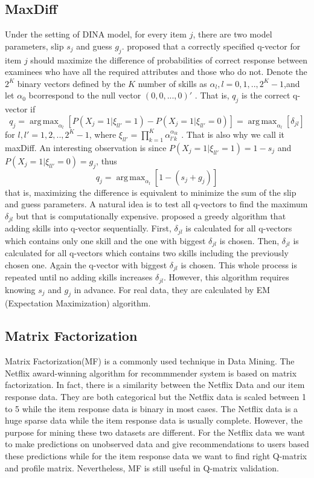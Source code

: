 \documentclass[12pt]{article}
\DeclareMathOperator*{\argmax}{arg\,max}
\begin{document}
\subsection{MaxDiff}
Under the setting of DINA model, for every item $j$, there are two model parameters, slip $s_j$ and guess $g_j$. \cite{de2008empirically} proposed that a correctly specified q-vector for item $j$ should maximize the difference of probabilities of correct response between examinees who have all the required attributes and those who do not. Denote the $2^K$ binary vectors defined by the $K$ number of skills as $\alpha_l, l=0,1,..,2^{K}-1$,and let $\alpha_0$ bcorrespond to the null vector $(0,0,...,0)'$ .  That is, $q_j$ is the correct q-vector if 
$$ q_j=\argmax_{\alpha _l}[P(X_j=1|\xi_{ll'}=1)-P(X_j=1|\xi_{ll'}=0)]=\argmax_{\alpha _l}[\delta_{jl}]$$
for $l,l'=1,2,..,2^K-1$, where $\xi_{ll'}=\prod_{k=1}^{K}\alpha_{l'k}^{\alpha_{lk}}$ . That is also why we call it maxDiff. An interesting observation is since $P(X_j=1|\xi_{ll'}=1)=1-s_j$ and $P(X_j=1|\xi_{ll'}=0)=g_j$, thus $$q_j=\argmax_{\alpha _l}[1-(s_j+g_j)]$$ 
that is, maximizing the difference is equivalent to minimize the sum of the slip and guess parameters. A natural idea is to test all q-vectors to find the maximum $\delta_{jl}$ but that is computationally expensive. \cite{de2008empirically} proposed a greedy algorithm that adding skills into q-vector sequentially. First, $\delta_{jl}$ is calculated for all q-vectors which contains only one skill and the one with biggest $\delta_{jl}$ is chosen. Then, $\delta_{jl}$ is calculated for all q-vectors which contains two skills including the previously chosen one. Again the q-vector with biggest $\delta_{jl}$ is chosen. This whole process is repeated until no adding skills increases $\delta_{jl}$. However, this algorithm requires knowing $s_j$ and $g_j$ in advance. For real data, they are calculated by EM (Expectation Maximization) algorithm\cite{de2009dina}.  



\subsection{Matrix Factorization}
Matrix Factorization(MF) is a commonly used technique in Data Mining. The Netflix award-winning algorithm for recommmender system is based on matrix factorization\cite{koren2009matrix,desmarais2013matrix,desmarais2015combining}. In fact, there is a similarity between the Netflix Data and our item response data. They are both categorical but the Netflix data is scaled between 1 to 5 while the item response data is binary in most cases. The Netflix data is a huge sparse data while the item response data is usually complete. However, the purpose for mining these two datasets are different. For the Netflix data we want to make predictions on unobserved data and give recommendations to users based these predictions while for the item response data we want to find right Q-matrix and profile matrix. Nevertheless, MF is still useful in Q-matrix validation\cite{desmarais2014refinement}. 
\end{document}

